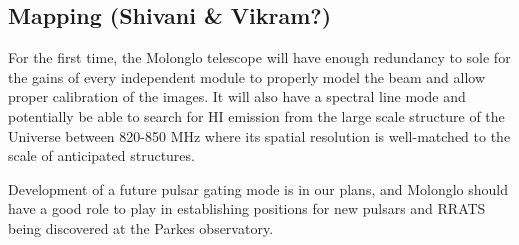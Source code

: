 \subsection{Mapping (Shivani & Vikram?)}

For the first time, the Molonglo telescope will have enough redundancy to sole for the gains of every independent module to properly model the beam and allow proper calibration of the images. It will also have a spectral line mode and potentially be able to search for HI emission from the large scale structure of the Universe between 820-850 MHz where its spatial resolution is well-matched to the scale of anticipated structures.

Development of a future pulsar gating mode is in our plans, and Molonglo should have a good role to play in establishing positions for new pulsars and RRATS being discovered at the Parkes observatory.